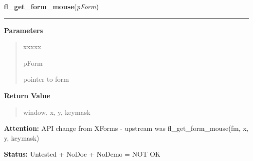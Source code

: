     \vspace{0.5ex}

\hspace{.8\funcindent}\begin{boxedminipage}{\funcwidth}

    \raggedright \textbf{fl\_get\_form\_mouse}(\textit{pForm})

    \vspace{-1.5ex}

    \rule{\textwidth}{0.5\fboxrule}
\setlength{\parskip}{2ex}
\setlength{\parskip}{1ex}
      \textbf{Parameters}
      \vspace{-1ex}

      \begin{quote}
        \begin{Ventry}{xxxxx}

          \item[pForm]

          pointer to form

        \end{Ventry}

      \end{quote}

      \textbf{Return Value}
    \vspace{-1ex}

      \begin{quote}
      window, x, y, keymask

      \end{quote}

\textbf{Attention:} API change from XForms - upstream was fl\_get\_form\_mouse(fm, x, y, 
keymask)



\textbf{Status:} Untested + NoDoc + NoDemo = NOT OK



    \end{boxedminipage}

    \label{xformslib:library:fl_win_to_form}

    \vspace{0.5ex}

